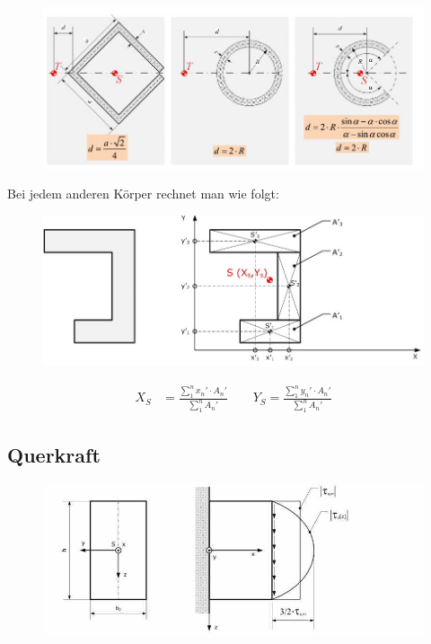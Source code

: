 \begin{figure}[h]
	\centering
	\includegraphics[scale=0.7]{Schubmittelpunk_2.jpg}
\end{figure}

\newpage

Bei jedem anderen Körper rechnet man wie folgt:

\begin{figure}[h]
	\centering
	\includegraphics[scale=0.7]{Schubmittelpunk_Rechnung.jpg}
\end{figure}

\begin{align*}
X_S &= \frac{\sum_{1}^{n} x_n' \cdot A_n'}{\sum_{1}^{n} A_n'} \qquad
Y_S = \frac{\sum_{1}^{n} y_n' \cdot A_n'}{\sum_{1}^{n} A_n'} 
\end{align*}

\subsection*{Querkraft}


\begin{figure}[h]
	\centering
	\includegraphics[scale=0.7]{Querkraftschub.jpg}
\end{figure}

